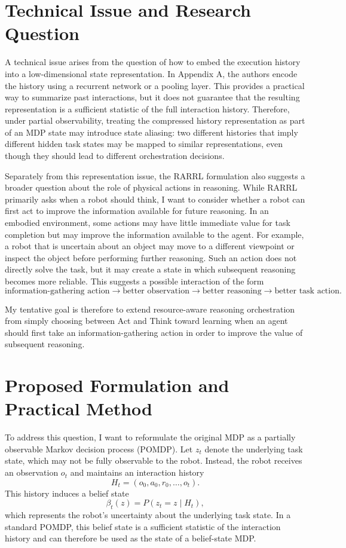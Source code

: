 \documentclass[11pt]{article}
\begin{document}
\section{Technical Issue and Research Question}
A technical issue arises from the question of how to embed the execution history into a low-dimensional state representation. In Appendix A, the authors encode the history using a recurrent network or a pooling layer. This provides a practical way to summarize past interactions, but it does not guarantee that the resulting representation is a sufficient statistic of the full interaction history. Therefore, under partial observability, treating the compressed history representation as part of an MDP state may introduce state aliasing: two different histories that imply different hidden task states may be mapped to similar representations, even though they should lead to different orchestration decisions.

Separately from this representation issue, the RARRL formulation also suggests a broader question about the role of physical actions in reasoning. While RARRL primarily asks when a robot should think, I want to consider whether a robot can first act to improve the information available for future reasoning.
In an embodied environment, some actions may have little immediate value for task completion but may improve the information available to the agent. For example, a robot that is uncertain about an object may move to a different viewpoint or inspect the object before performing further reasoning. Such an action does not directly solve the task, but it may create a state in which subsequent reasoning becomes more reliable. This suggests a possible interaction of the form
\[
\text{information-gathering action}
\rightarrow
\text{better observation}
\rightarrow
\text{better reasoning}
\rightarrow
\text{better task action}.
\]

My tentative goal is therefore to extend resource-aware reasoning orchestration from simply choosing between Act and Think toward learning when an agent should first take an information-gathering action in order to improve the value of subsequent reasoning.

\section{Proposed Formulation and Practical Method}

To address this question, I want to reformulate the original MDP as a partially observable Markov decision process (POMDP). Let $z_t$ denote the underlying task state, which may not be fully observable to the robot. Instead, the robot receives an observation $o_t$ and maintains an interaction history
\[
H_t=(o_0,a_0,r_0,\ldots,o_t).
\]
This history induces a belief state
\[
\beta_t(z)=P(z_t=z\mid H_t),
\]
which represents the robot's uncertainty about the underlying task state. In a standard POMDP, this belief state is a sufficient statistic of the interaction history and can therefore be used as the state of a belief-state MDP.
\end{document}
